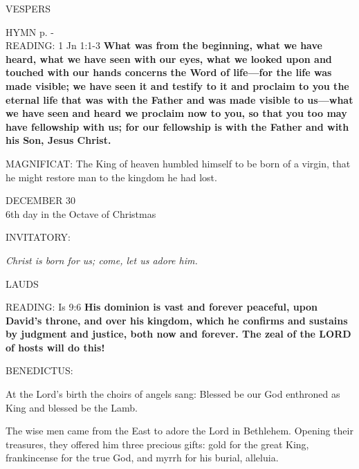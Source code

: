 \begin{flushleft}\normalsize{\uppercase{VESPERS\\}}\end{flushleft}
\small{\uppercase{HYMN} p. \pageref{christmas:firstHymn}-\pageref{christmas:lastHymn}\\}
\noindent\small{\uppercase{READING:}}    1 Jn 1:1-3 \textbf{    What was from the beginning, what we have heard, what we have seen with our eyes, what we looked upon and touched with our hands concerns the Word of life—for the life was made visible; we have seen it and testify to it and proclaim to you the eternal life that was with the Father and was made visible to us—what we have seen and heard we proclaim now to you, so that you too may have fellowship with us; for our fellowship is with the Father and with his Son, Jesus Christ.\\}

\noindent\small{\uppercase{MAGNIFICAT:}}	The King of heaven humbled himself to be born of a virgin, that he might restore man to the kingdom he had lost.\\

\begin{center}DECEMBER 30\\
\footnotesize{6th day in the Octave of Christmas}
\end{center}

\noindent\small{\uppercase{INVITATORY:}}\normalsize
\begin{center}
\textit{Christ is born for us; come, let us adore him.\\}
\end{center}
\begin{flushleft}\normalsize{\uppercase{LAUDS\\}}\end{flushleft}
\noindent\small{\uppercase{READING:}}    Is 9:6 \textbf{    His dominion is vast and forever peaceful, upon David’s throne, and over his kingdom, which he confirms and sustains by judgment and justice, both now and forever. The zeal of the LORD of hosts will do this!\\}

\noindent\small{\uppercase{BENEDICTUS:}} \begin{description}[labelindent=\parindent, leftmargin=*]
\item [(before Epiphany)] At the Lord's birth the choirs of angels sang: Blessed be our God enthroned as King and blessed be the Lamb.
\item [(Monday after Epiphany)]The wise men came from the East to adore the Lord in Bethlehem. Opening their treasures, they offered him three precious gifts: gold for the great King, frankincense for the true God, and myrrh for his burial, alleluia.\\
\end{description}

